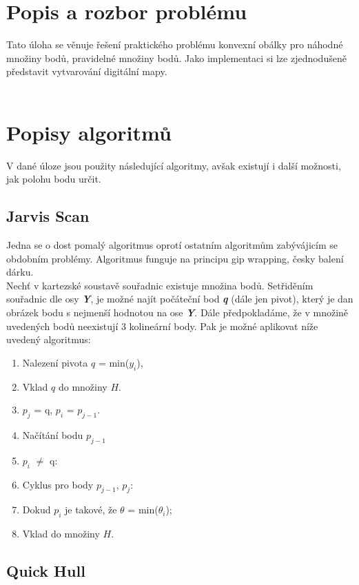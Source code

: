 \documentclass{article}
\begin{document}
\section{Popis a rozbor problému} %
\indent 
Tato úloha se věnuje řešení praktického problému konvexní obálky pro náhodné množiny bodů, pravidelné množiny bodů. Jako implementaci si lze zjednodušeně představit vytvarování digitální mapy. 
\\
\\
\clearpage
\section{Popisy algoritmů} %
V dané úloze jsou použity následující algoritmy, avšak existují i další možnosti, jak polohu bodu určit.
\subsection{Jarvis Scan}
 Jedna se o dost pomalý algoritmus oprotí ostatním algoritmům zabývájicím se obdobním problémy. Algoritmus funguje na principu gip wrapping, česky balení dárku.\\
\bigskip
Nechť v kartezské soustavě souřadnic existuje množina bodů. Setřiděním souřadnic dle osy  \textit{\textbf {Y}}, je možné najít počáteční bod \textit{\textbf {q}} (dále jen pivot), který je dan obrázek bodu s nejmenší hodnotou na ose \textit{\textbf {Y}}. Dále předpokladáme, že v množině uvedených bodů neexistují 3 kolineární body. Pak je možné aplikovat níže uvedený algoritmus:\\
\bigskip
\begin{enumerate}
\item Nalezení pivota $q$ = min($y_i$),
\item Vklad $q$ do množiny $H$.
\item $p_j$ = q, $p_i$ = $p_{j-1}$.
\item Načítání bodu $p_{j-1}$
\item  $p_i$ $\ne$ q:
\item Cyklus pro body $p_{j-1}$, $p_j$:
\item Dokud $p_i$ je takové, že $\theta$ = min($\theta_i$);
\item Vklad do množiny  $H$.
\end{enumerate}
\clearpage
\newpage
\subsection{Quick Hull} 
\end{document}
